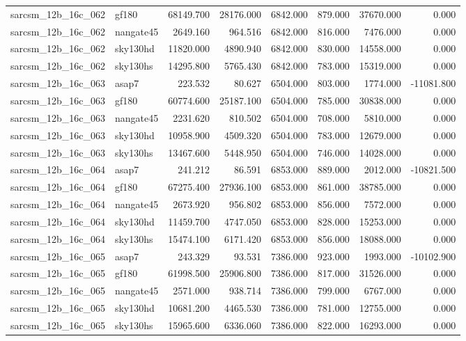 \begin{tabular}{llrrrrrr}
sarcsm\_12b\_16c\_062 & gf180 & 68149.700 & 28176.000 & 6842.000 & 879.000 & 37670.000 & 0.000 \\
sarcsm\_12b\_16c\_062 & nangate45 & 2649.160 & 964.516 & 6842.000 & 816.000 & 7476.000 & 0.000 \\
sarcsm\_12b\_16c\_062 & sky130hd & 11820.000 & 4890.940 & 6842.000 & 830.000 & 14558.000 & 0.000 \\
sarcsm\_12b\_16c\_062 & sky130hs & 14295.800 & 5765.430 & 6842.000 & 783.000 & 15319.000 & 0.000 \\
sarcsm\_12b\_16c\_063 & asap7 & 223.532 & 80.627 & 6504.000 & 803.000 & 1774.000 & -11081.800 \\
sarcsm\_12b\_16c\_063 & gf180 & 60774.600 & 25187.100 & 6504.000 & 785.000 & 30838.000 & 0.000 \\
sarcsm\_12b\_16c\_063 & nangate45 & 2231.620 & 810.502 & 6504.000 & 708.000 & 5810.000 & 0.000 \\
sarcsm\_12b\_16c\_063 & sky130hd & 10958.900 & 4509.320 & 6504.000 & 783.000 & 12679.000 & 0.000 \\
sarcsm\_12b\_16c\_063 & sky130hs & 13467.600 & 5448.950 & 6504.000 & 746.000 & 14028.000 & 0.000 \\
sarcsm\_12b\_16c\_064 & asap7 & 241.212 & 86.591 & 6853.000 & 889.000 & 2012.000 & -10821.500 \\
sarcsm\_12b\_16c\_064 & gf180 & 67275.400 & 27936.100 & 6853.000 & 861.000 & 38785.000 & 0.000 \\
sarcsm\_12b\_16c\_064 & nangate45 & 2673.920 & 956.802 & 6853.000 & 856.000 & 7572.000 & 0.000 \\
sarcsm\_12b\_16c\_064 & sky130hd & 11459.700 & 4747.050 & 6853.000 & 828.000 & 15253.000 & 0.000 \\
sarcsm\_12b\_16c\_064 & sky130hs & 15474.100 & 6171.420 & 6853.000 & 856.000 & 18088.000 & 0.000 \\
sarcsm\_12b\_16c\_065 & asap7 & 243.329 & 93.531 & 7386.000 & 923.000 & 1993.000 & -10102.900 \\
sarcsm\_12b\_16c\_065 & gf180 & 61998.500 & 25906.800 & 7386.000 & 817.000 & 31526.000 & 0.000 \\
sarcsm\_12b\_16c\_065 & nangate45 & 2571.000 & 938.714 & 7386.000 & 799.000 & 6767.000 & 0.000 \\
sarcsm\_12b\_16c\_065 & sky130hd & 10681.200 & 4465.530 & 7386.000 & 781.000 & 12755.000 & 0.000 \\
sarcsm\_12b\_16c\_065 & sky130hs & 15965.600 & 6336.060 & 7386.000 & 822.000 & 16293.000 & 0.000 \\

\end{tabular}
